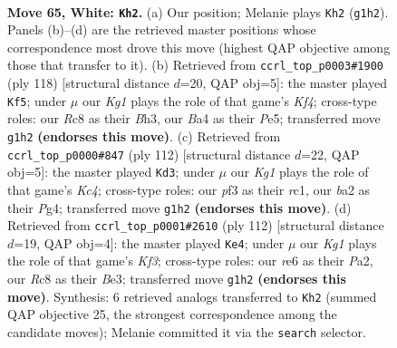 \documentclass[11pt]{article}
\begin{document}
\clearpage

\begin{figure}[p]\centering
\begin{subfigure}{0.46\textwidth}\centering
\resizebox{\linewidth}{!}{%
\newchessgame
\chessboard[
  setfen={2R5/6k1/4r3/8/B3p2p/4Bp1P/b4P2/6K1 w - - 40 65},
  showmover=false,
  pgfstyle=straightmove, color=movearrow, markmove={g1-h2}
]}
\caption{}
\end{subfigure}\hfill
\begin{subfigure}{0.46\textwidth}\centering
\resizebox{\linewidth}{!}{%
\newchessgame
\chessboard[
  setfen={3k4/5p2/1p6/p1b1P3/P4K1p/1P5B/8/8 w - - 36 60},
  showmover=false,
  pgfstyle=straightmove, color=movearrow, markmove={f4-f5}
]}
\caption{}
\end{subfigure}
\\[4pt]
\begin{subfigure}{0.46\textwidth}\centering
\resizebox{\linewidth}{!}{%
\newchessgame
\chessboard[
  setfen={5k2/R2B1p2/3p4/4b1pP/2K1P1P1/8/8/2r5 w - - 29 57},
  showmover=false,
  pgfstyle=straightmove, color=movearrow, markmove={c4-d3}
]}
\caption{}
\end{subfigure}\hfill
\begin{subfigure}{0.46\textwidth}\centering
\resizebox{\linewidth}{!}{%
\newchessgame
\chessboard[
  setfen={7k/6p1/3r4/p6p/1pB4P/1P2BK2/P7/8 w - - 3 57},
  showmover=false,
  pgfstyle=straightmove, color=movearrow, markmove={f3-e4}
]}
\caption{}
\end{subfigure}
\caption{\textbf{Move 65, White: \texttt{Kh2}.} (a) Our position; Melanie plays \texttt{Kh2} (\texttt{g1h2}). Panels (b)--(d) are the retrieved master positions whose correspondence most drove this move (highest QAP objective among those that transfer to it). (b) Retrieved from \texttt{ccrl\_top\_p0003\#1900} (ply 118) [structural distance $d$=20, QAP obj=5]: the master played \texttt{Kf5}; under $\mu$ our \emph{Kg1} plays the role of that game's \emph{Kf4}; cross-type roles: our \emph{R}c8 as their \emph{B}h3, our \emph{B}a4 as their \emph{P}e5; transferred move \texttt{g1h2} \textbf{(endorses this move)}. (c) Retrieved from \texttt{ccrl\_top\_p0000\#847} (ply 112) [structural distance $d$=22, QAP obj=5]: the master played \texttt{Kd3}; under $\mu$ our \emph{Kg1} plays the role of that game's \emph{Kc4}; cross-type roles: our \emph{p}f3 as their \emph{r}c1, our \emph{b}a2 as their \emph{P}g4; transferred move \texttt{g1h2} \textbf{(endorses this move)}. (d) Retrieved from \texttt{ccrl\_top\_p0001\#2610} (ply 112) [structural distance $d$=19, QAP obj=4]: the master played \texttt{Ke4}; under $\mu$ our \emph{Kg1} plays the role of that game's \emph{Kf3}; cross-type roles: our \emph{r}e6 as their \emph{P}a2, our \emph{R}c8 as their \emph{B}e3; transferred move \texttt{g1h2} \textbf{(endorses this move)}. Synthesis: 6 retrieved analogs transferred to \texttt{Kh2} (summed QAP objective 25, the strongest correspondence among the candidate moves); Melanie committed it via the \texttt{search} selector.}
\label{fig:thought-m128}
\end{figure}
\end{document}
